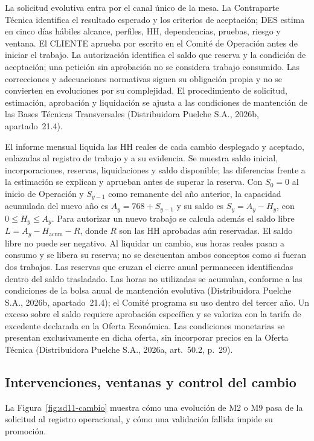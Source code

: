 La solicitud evolutiva entra por el canal único de la mesa. La Contraparte Técnica identifica el resultado esperado y los criterios de aceptación; DES estima en cinco días hábiles alcance, perfiles, HH, dependencias, pruebas, riesgo y ventana. El CLIENTE aprueba por escrito en el Comité de Operación antes de iniciar el trabajo. La autorización identifica el saldo que reserva y la condición de aceptación; una petición sin aprobación no se considera trabajo consumido. Las correcciones y adecuaciones normativas siguen su obligación propia y no se convierten en evoluciones por su complejidad. El procedimiento de solicitud, estimación, aprobación y liquidación se ajusta a las condiciones de mantención de las Bases Técnicas Transversales (Distribuidora Puelche S.A., 2026b, apartado~21.4).

El informe mensual liquida las HH reales de cada cambio desplegado y aceptado, enlazadas al registro de trabajo y a su evidencia. Se muestra saldo inicial, incorporaciones, reservas, liquidaciones y saldo disponible; las diferencias frente a la estimación se explican y aprueban antes de superar la reserva. Con $S_0=0$ al inicio de Operación y $S_{y-1}$ como remanente del año anterior, la capacidad acumulada del nuevo año es $A_y=768+S_{y-1}$ y su saldo es $S_y=A_y-H_y$, con $0\leq H_y\leq A_y$. Para autorizar un nuevo trabajo se calcula además el saldo libre $L=A_y-H_{\mathrm{acum}}-R$, donde $R$ son las HH aprobadas aún reservadas. El saldo libre no puede ser negativo. Al liquidar un cambio, sus horas reales pasan a consumo y se libera su reserva; no se descuentan ambos conceptos como si fueran dos trabajos. Las reservas que cruzan el cierre anual permanecen identificadas dentro del saldo trasladado. Las horas no utilizadas se acumulan, conforme a las condiciones de la bolsa anual de mantención evolutiva (Distribuidora Puelche S.A., 2026b, apartado~21.4); el Comité programa su uso dentro del tercer año. Un exceso sobre el saldo requiere aprobación específica y se valoriza con la tarifa de excedente declarada en la Oferta Económica. Las condiciones monetarias se presentan exclusivamente en dicha oferta, sin incorporar precios en la Oferta Técnica (Distribuidora Puelche S.A., 2026a, art.~50.2, p.~29).

\subsection{Intervenciones, ventanas y control del cambio}
\label{subsec:sd11-intervenciones}

La Figura~\ref{fig:sd11-cambio} muestra cómo una evolución de M2 o M9 pasa de la solicitud al registro operacional, y cómo una validación fallida impide su promoción.

